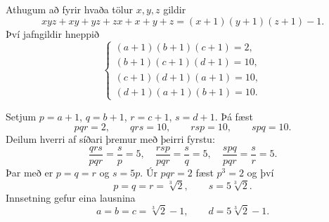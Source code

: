Athugum að fyrir hvaða tölur $x,y,z$ gildir
\[
xyz + xy + yz + zx + x + y + z = (x+1)(y+1)(z+1) - 1.
\]
Því jafngildir hneppið
\[
    \begin{cases}
    (a+1)(b+1)(c+1)=2,\\[2pt]
    (b+1)(c+1)(d+1)=10,\\[2pt]
    (c+1)(d+1)(a+1)=10,\\[2pt]
    (d+1)(a+1)(b+1)=10.
    \end{cases}
\]

Setjum $p=a+1$, $q=b+1$, $r=c+1$, $s=d+1$. Þá fæst
\[
pqr=2,\qquad qrs=10,\qquad rsp=10,\qquad spq=10.
\]
Deilum hverri af síðari þremur með þeirri fyrstu:
\[
\frac{qrs}{pqr}=\frac{s}{p}=5,\quad
\frac{rsp}{pqr}=\frac{s}{q}=5,\quad
\frac{spq}{pqr}=\frac{s}{r}=5.
\]
Þar með er $p=q=r$ og $s=5p$. Úr $pqr=2$ fæst $p^3=2$ og því
\[
p=q=r=\sqrt[3]{2},\qquad s=5\sqrt[3]{2}.
\]
Innsetning gefur eina lausnina
\[
a=b=c=\sqrt[3]{2}-1,\qquad d=5\sqrt[3]{2}-1.
\]